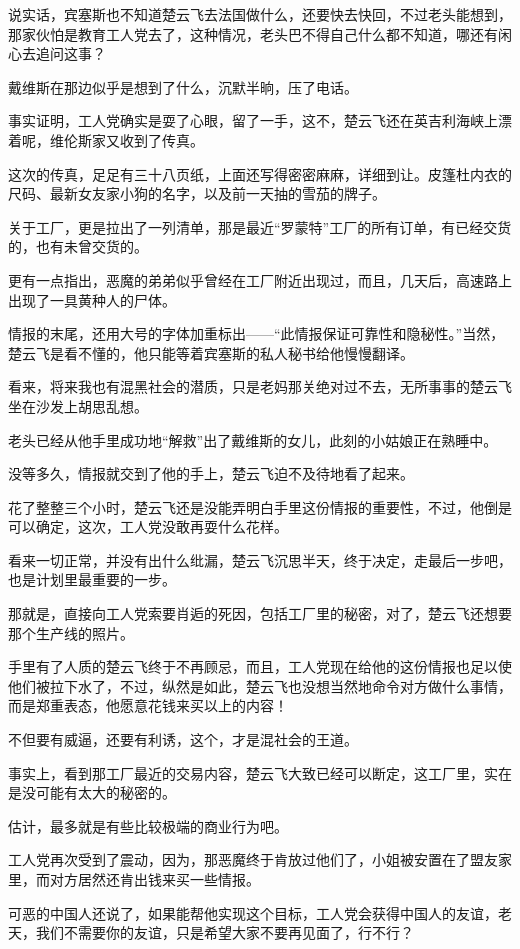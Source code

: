 说实话，宾塞斯也不知道楚云飞去法国做什么，还要快去快回，不过老头能想到，那家伙怕是教育工人党去了，这种情况，老头巴不得自己什么都不知道，哪还有闲心去追问这事？

戴维斯在那边似乎是想到了什么，沉默半晌，压了电话。

事实证明，工人党确实是耍了心眼，留了一手，这不，楚云飞还在英吉利海峡上漂着呢，维伦斯家又收到了传真。

这次的传真，足足有三十八页纸，上面还写得密密麻麻，详细到让。皮篷杜内衣的尺码、最新女友家小狗的名字，以及前一天抽的雪茄的牌子。

关于工厂，更是拉出了一列清单，那是最近“罗蒙特”工厂的所有订单，有已经交货的，也有未曾交货的。

更有一点指出，恶魔的弟弟似乎曾经在工厂附近出现过，而且，几天后，高速路上出现了一具黄种人的尸体。

情报的末尾，还用大号的字体加重标出——“此情报保证可靠性和隐秘性。”当然，楚云飞是看不懂的，他只能等着宾塞斯的私人秘书给他慢慢翻译。

看来，将来我也有混黑社会的潜质，只是老妈那关绝对过不去，无所事事的楚云飞坐在沙发上胡思乱想。

老头已经从他手里成功地“解救”出了戴维斯的女儿，此刻的小姑娘正在熟睡中。

没等多久，情报就交到了他的手上，楚云飞迫不及待地看了起来。

花了整整三个小时，楚云飞还是没能弄明白手里这份情报的重要性，不过，他倒是可以确定，这次，工人党没敢再耍什么花样。

看来一切正常，并没有出什么纰漏，楚云飞沉思半天，终于决定，走最后一步吧，也是计划里最重要的一步。

那就是，直接向工人党索要肖逅的死因，包括工厂里的秘密，对了，楚云飞还想要那个生产线的照片。

手里有了人质的楚云飞终于不再顾忌，而且，工人党现在给他的这份情报也足以使他们被拉下水了，不过，纵然是如此，楚云飞也没想当然地命令对方做什么事情，而是郑重表态，他愿意花钱来买以上的内容！

不但要有威逼，还要有利诱，这个，才是混社会的王道。

事实上，看到那工厂最近的交易内容，楚云飞大致已经可以断定，这工厂里，实在是没可能有太大的秘密的。

估计，最多就是有些比较极端的商业行为吧。

工人党再次受到了震动，因为，那恶魔终于肯放过他们了，小姐被安置在了盟友家里，而对方居然还肯出钱来买一些情报。

可恶的中国人还说了，如果能帮他实现这个目标，工人党会获得中国人的友谊，老天，我们不需要你的友谊，只是希望大家不要再见面了，行不行？

